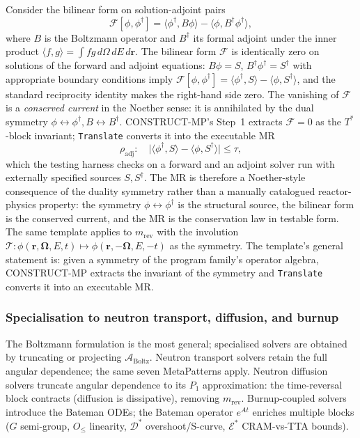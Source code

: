 \documentclass[manuscript]{acmart}
\begin{document}
Consider the bilinear form on solution-adjoint pairs
\begin{equation}
\label{eq:bilinear-boltz}
\mathcal{F}[\phi, \phi^{\dagger}] = \langle \phi^{\dagger}, B\phi \rangle - \langle \phi, B^{\dagger}\phi^{\dagger} \rangle,
\end{equation}
where $B$ is the Boltzmann operator and $B^{\dagger}$ its formal adjoint under the inner product $\langle f, g \rangle = \int f g \,d\Omega\,dE\,d\mathbf{r}$. The bilinear form $\mathcal{F}$ is identically zero on solutions of the forward and adjoint equations: $B\phi = S$, $B^{\dagger}\phi^{\dagger} = S^{\dagger}$ with appropriate boundary conditions imply $\mathcal{F}[\phi, \phi^{\dagger}] = \langle \phi^{\dagger}, S \rangle - \langle \phi, S^{\dagger} \rangle$, and the standard reciprocity identity makes the right-hand side zero. The vanishing of $\mathcal{F}$ is a \emph{conserved current} in the Noether sense: it is annihilated by the dual symmetry $\phi \leftrightarrow \phi^{\dagger}, B \leftrightarrow B^{\dagger}$. CONSTRUCT-MP's Step~1 extracts $\mathcal{F} = 0$ as the $T^{*}$-block invariant; \texttt{Translate} converts it into the executable MR
\begin{equation}
\label{eq:m-adj-mr}
\rho_{\mathrm{adj}}: \quad \big| \langle \phi^{\dagger}, S \rangle - \langle \phi, S^{\dagger} \rangle \big| \le \tau,
\end{equation}
which the testing harness checks on a forward and an adjoint solver run with externally specified sources $S, S^{\dagger}$. The MR is therefore a Noether-style consequence of the duality symmetry rather than a manually catalogued reactor-physics property: the symmetry $\phi \leftrightarrow \phi^{\dagger}$ is the structural source, the bilinear form is the conserved current, and the MR is the conservation law in testable form. The same template applies to $m_{\mathrm{rev}}$ with the involution $\mathcal{T}: \phi(\mathbf{r}, \boldsymbol{\Omega}, E, t) \mapsto \phi(\mathbf{r}, -\boldsymbol{\Omega}, E, -t)$ as the symmetry. The template's general statement is: given a symmetry of the program family's operator algebra, CONSTRUCT-MP extracts the invariant of the symmetry and \texttt{Translate} converts it into an executable MR.

\subsubsection{Specialisation to neutron transport, diffusion, and burnup}

The Boltzmann formulation is the most general; specialised solvers are obtained by truncating or projecting $\mathcal{A}_{\mathrm{Boltz}}$. Neutron transport solvers retain the full angular dependence; the same seven MetaPatterns apply. Neutron diffusion solvers truncate angular dependence to its $P_1$ approximation: the time-reversal block contracts (diffusion is dissipative), removing $m_{\mathrm{rev}}$. Burnup-coupled solvers introduce the Bateman ODEs; the Bateman operator $e^{At}$ enriches multiple blocks ($G$ semi-group, $O_{\le}$ linearity, $\mathcal{D}^{*}$ overshoot/S-curve, $\mathcal{E}^{*}$ CRAM-vs-TTA bounds).
\end{document}
